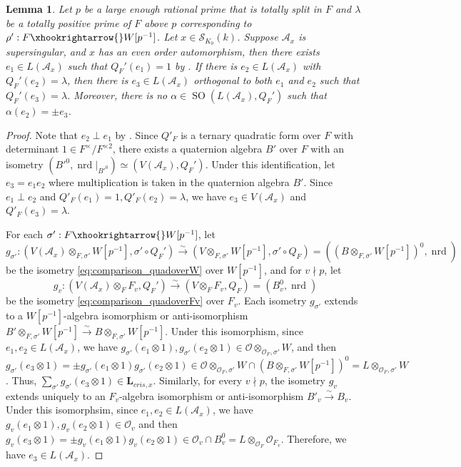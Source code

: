 \documentclass{amsart}
\numberwithin{equation}{subsection}
\numberwithin{theorem}{section}
\newtheorem{lemma}[theorem]{Lemma}
\theoremstyle{definition}
\theoremstyle{remark}
\newcommand{\cA}{\mathcal{A}}
\newcommand{\cO}{\mathcal{O}}
\DeclareMathOperator{\SO}{SO}
\DeclareMathOperator{\nrd}{nrd}
\begin{document}
\begin{lemma} \label{lem:pairend}
    Let $p$ be a large enough rational prime that is totally split in $F$ and $\lambda$ be a totally positive prime of $F$ above $p$ corresponding to $\rho': F\xhookrightarrow{}W[p^{-1}]$. Let $x\in \mathscr{S}_{K_0}(k)$. Suppose $\cA_x$ is supersingular, and $x$ has an even order automorphism, then there exists $e_1 \in L(\cA_x)$ such that $Q_F'(e_1) = 1$ by . If there is $e_2\in L(\cA_x)$ with $Q_F'(e_2) = \lambda$, then there is $e_3 \in L(\cA_x)$ orthogonal to both $e_1$ and $e_2$ such that $Q_F'(e_3) =\lambda$. Moreover, there is no $\alpha\in \SO(L(\cA_x), Q_F')$ such that $\alpha(e_2) = \pm e_3$. 
\end{lemma}
\begin{proof}
    Note that $e_2\perp e_1$ by .
    Since $Q'_F$ is a ternary quadratic form over $F$ with determinant $1\in F^\times/F^{\times 2}$, there exists a quaternion algebra $B'$ over $F$ with an isometry $(B'^{0}, \nrd|_{B'^{0}})\simeq (V(\mathcal{A}_x), Q_F')$. Under this identification, let $e_3 = e_1e_2$ where multiplication is taken in the quaternion algebra $B'$. Since $e_1\perp e_2$ and $Q'_F(e_1) = 1, Q'_F(e_2) = \lambda$, we have $e_3\in V(\mathcal{A}_x)$ and $Q'_F(e_3) = \lambda$. 

    For each $\sigma': F\xhookrightarrow{}W[p^{-1}]$, let \[g_{\sigma'}: (V(\cA_x)\otimes_{F, \sigma'} W[p^{-1}], \sigma'\circ Q_F') \xrightarrow{\sim} (V\otimes_{F, \sigma'}W[p^{-1}], \sigma'\circ Q_F) = ((B\otimes_{F, \sigma'}W[p^{-1}])^0,  \nrd)\] be the isometry  \eqref{eq:comparison_quadoverW} over $W[p^{-1}]$, and for $v\nmid p$, let \[ g_v:  (V(\cA_x)\otimes_{F} F_v,  Q_F')\xrightarrow{\sim} (V\otimes_{F}F_v,  Q_F) = (B_v^0, \nrd) \] be the isometry \eqref{eq:comparison_quadoverFv} over $F_v$. 
    Each isometry $g_{\sigma'}$ extends to a $W[p^{-1}]$-algebra isomorphism or anti-isomorphism $B'\otimes_{F, \sigma'}W[p^{-1}] \xrightarrow{\sim} B\otimes_{F,\sigma'} W[p^{-1}]$. Under this isomorphism, since $e_1, e_2\in L(\cA_x)$, we have $g_{\sigma'}(e_1\otimes1), g_{\sigma'}(e_2\otimes 1) \in \mathcal{O}\otimes_{\cO_F,\sigma'} W$, and then $g_{\sigma'}(e_3 \otimes 1) = \pm g_{\sigma'}(e_1 \otimes 1)g_{\sigma'}(e_2 \otimes 1)\in\mathcal{O}\otimes_{\cO_F,\sigma'} W\cap (B\otimes_{F,\sigma'} W[p^{-1}])^0 = L\otimes_{\cO_F, \sigma'} W$. Thus, $\sum_{\sigma'} g_{\sigma'} (e_3\otimes 1)\in \bm{L}_{cris,x}$. Similarly, for every $v\nmid p$, the isometry $g_v$ extends uniquely to an $F_v$-algebra isomorphism or anti-isomorphism $B'_{v} \xrightarrow{\sim} B_{v}$. %
    Under this isomorphsim, since $e_1, e_2\in L(\mathcal{A}_x)$, we have $g_v(e_1\otimes1), g_v(e_2\otimes 1) \in \mathcal{O}_{v}$ and then $g_v(e_3\otimes 1) = \pm g_v(e_1\otimes 1) g_v(e_2\otimes 1) \in \mathcal{O}_{v}\cap B_{v}^0 = L\otimes_{\cO_F}\cO_{F_v}$. 
    Therefore, we have $e_3\in L(\mathcal{A}_x)$.


\end{proof}
\end{document}
